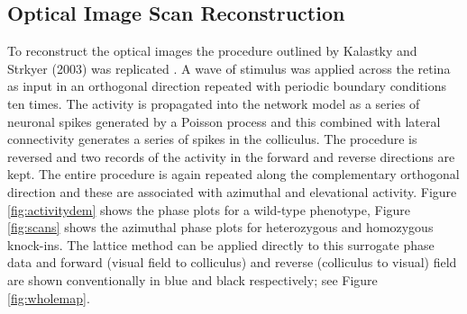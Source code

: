\subsection{Optical Image Scan Reconstruction \label{section:OIS}} 
To reconstruct the optical images the procedure outlined by Kalastky and Strkyer (2003) was replicated \cite{Kalatsky2003-cz}. A wave of stimulus was applied across the retina as input in an orthogonal direction repeated with periodic boundary conditions ten times. The activity is propagated into the network model as a series of neuronal spikes generated by a Poisson process and this combined with lateral connectivity generates a series of spikes in the colliculus. The procedure is reversed and two records of the activity in the forward and reverse directions are kept. The entire procedure is again repeated along the complementary orthogonal direction and these are associated with azimuthal and elevational activity. Figure \ref{fig:activitydem} shows the phase plots for a wild-type phenotype, Figure \ref{fig:scans} shows the azimuthal phase plots for heterozygous and homozygous knock-ins. The lattice method can be applied directly to this surrogate phase data and forward (visual field to colliculus) and reverse (colliculus to visual) field are shown conventionally in blue and black respectively; see Figure \ref{fig:wholemap}.
